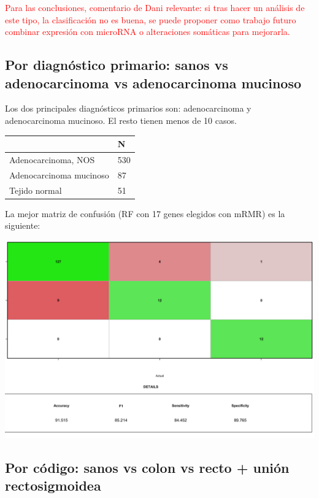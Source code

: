 \textcolor{red}{Para las conclusiones, comentario de Dani relevante: si tras hacer un análisis de este tipo, la clasificación no es buena, se puede proponer como trabajo futuro combinar expresión con microRNA o alteraciones somáticas para mejorarla.}

\subsection{Por diagnóstico primario: sanos vs adenocarcinoma vs adenocarcinoma mucinoso}

Los dos principales diagnósticos primarios son: adenocarcinoma y adenocarcinoma mucinoso. El resto tienen menos de 10 casos.

\begin{table}[H]
	\centering
	\begin{tabular}{|l|l|}
		\hline
		& N   \\ \hline
		Adenocarcinoma, NOS     & 530 \\ \hline
		Adenocarcinoma mucinoso & 87  \\ \hline
		Tejido normal           & 51  \\ \hline
	\end{tabular}
\end{table}

La mejor matriz de confusión (RF con 17 genes elegidos con mRMR) es la siguiente:

\begin{center}
	\includegraphics[width=.7\textwidth]{figuras/auxiliares/cr_04_analisis_multiclase_primary_diagnosis/25_rf_matriz_confusion_mejor_metodo.png} 
\end{center}

\subsection{Por código: sanos vs colon vs recto + unión rectosigmoidea}

